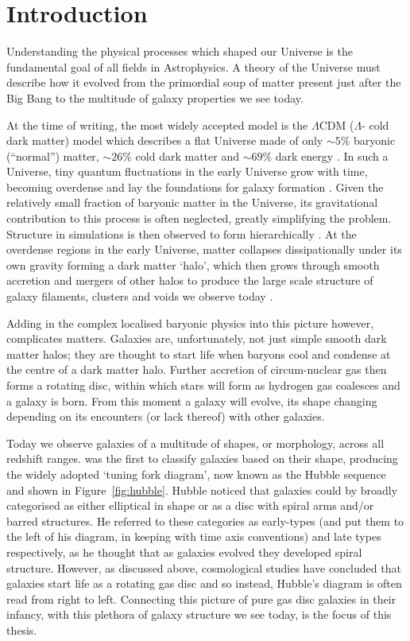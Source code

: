 \chapter{Introduction}\label{chap:intro}

Understanding the physical processes which shaped our Universe is the fundamental goal of all fields in Astrophysics. A theory of the Universe must describe how it evolved from the primordial soup of matter present just after the Big Bang to the multitude of galaxy properties we see today. 

At the time of writing, the most widely accepted model is the $\Lambda$CDM ($\Lambda$- cold dark matter) model which describes a flat Universe made of only $\sim5\%$ baryonic (``normal'') matter, $\sim26\%$ cold dark matter and $\sim69\%$ dark energy \citep{planck16}. In such a Universe, tiny quantum fluctuations in the early Universe grow with time, becoming overdense and lay the foundations for galaxy formation \citep{guth82, hawking82, linde82, starobinsky82}. Given the relatively small fraction of baryonic matter in the Universe, its gravitational contribution to this process is often neglected, greatly simplifying the problem. Structure in simulations is then observed to form hierarchically \citep{press74, gott75, white78, aarseth79, gott79, turner79, efstathiou81, davis85}. At the overdense regions in the early Universe, matter collapses dissipationally under its own gravity forming a dark matter `halo', which then grows through smooth accretion and mergers of other halos to produce the large scale structure of galaxy filaments, clusters and voids we observe today \citep[see comprehensive review by][]{frenk12}. 

Adding in the complex localised baryonic physics into this picture however, complicates matters. Galaxies are, unfortunately, not just simple smooth dark matter halos; they are thought to start life when baryons cool and condense at the centre of a dark matter halo. Further accretion of circum-nuclear gas then forms a rotating disc, within which stars will form as hydrogen gas coalesces and a galaxy is born. From this moment a galaxy will evolve, its shape changing depending on its encounters (or lack thereof) with other galaxies. 

Today we observe galaxies of a multitude of shapes, or morphology, across all redshift ranges. \cite{hubble36}  was the first to classify galaxies based on their shape, producing the widely adopted `tuning fork diagram', now known as the Hubble sequence and shown in Figure~\ref{fig:hubble}. Hubble noticed that galaxies could by broadly categorised as either elliptical in shape or as a disc with spiral arms and/or barred structures. He referred to these categories as early-types (and put them to the left of his diagram, in keeping with time axis conventions) and late types respectively, as he thought that as galaxies evolved they developed spiral structure. However, as discussed above, cosmological studies have concluded that galaxies start life as a rotating gas disc and so instead, Hubble's diagram is often read from right to left. Connecting this picture of pure gas disc galaxies in their infancy, with this plethora of galaxy structure we see today, is the focus of this thesis. 

